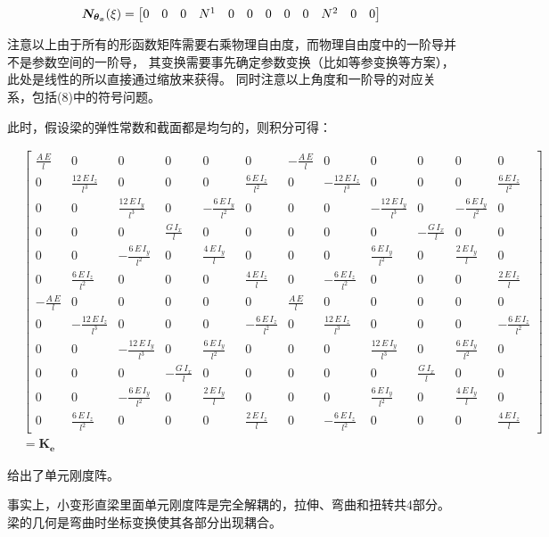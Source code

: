 \documentclass[UTF8,c5size]{ctexart}
\begin{document}
\begin{equation}
    \bm{N_{\theta_x}}(\xi) = 
    \addtocounter{MaxMatrixCols}{40}
    \begin{bmatrix}
        0&0&0&N^1&0&0&0&0&0&N^2&0&0
    \end{bmatrix}
\end{equation}

注意以上由于所有的形函数矩阵需要右乘物理自由度，而物理自由度中的一阶导并不是参数空间的一阶导，
其变换需要事先确定参数变换（比如等参变换等方案），此处是线性的所以直接通过缩放来获得。
同时注意以上角度和一阶导的对应关系，包括(8)中的符号问题。

此时，假设梁的弹性常数和截面都是均匀的，则积分可得：

\begin{equation}
    \begin{split}
        &\left[\begin{array}{cccccccccccc} \frac{A\,E}{l} & 0 & 0 & 0 & 0 & 0 & -\frac{A\,E}{l} & 0 & 0 & 0 & 0 & 0\\ 0 & \frac{12\,E\,I_{z}}{l^3} & 0 & 0 & 0 & \frac{6\,E\,I_{z}}{l^2} & 0 & -\frac{12\,E\,I_{z}}{l^3} & 0 & 0 & 0 & \frac{6\,E\,I_{z}}{l^2}\\ 0 & 0 & \frac{12\,E\,I_{y}}{l^3} & 0 & -\frac{6\,E\,I_{y}}{l^2} & 0 & 0 & 0 & -\frac{12\,E\,I_{y}}{l^3} & 0 & -\frac{6\,E\,I_{y}}{l^2} & 0\\ 0 & 0 & 0 & \frac{G\,I_{x}}{l} & 0 & 0 & 0 & 0 & 0 & -\frac{G\,I_{x}}{l} & 0 & 0\\ 0 & 0 & -\frac{6\,E\,I_{y}}{l^2} & 0 & \frac{4\,E\,I_{y}}{l} & 0 & 0 & 0 & \frac{6\,E\,I_{y}}{l^2} & 0 & \frac{2\,E\,I_{y}}{l} & 0\\ 0 & \frac{6\,E\,I_{z}}{l^2} & 0 & 0 & 0 & \frac{4\,E\,I_{z}}{l} & 0 & -\frac{6\,E\,I_{z}}{l^2} & 0 & 0 & 0 & \frac{2\,E\,I_{z}}{l}\\ -\frac{A\,E}{l} & 0 & 0 & 0 & 0 & 0 & \frac{A\,E}{l} & 0 & 0 & 0 & 0 & 0\\ 0 & -\frac{12\,E\,I_{z}}{l^3} & 0 & 0 & 0 & -\frac{6\,E\,I_{z}}{l^2} & 0 & \frac{12\,E\,I_{z}}{l^3} & 0 & 0 & 0 & -\frac{6\,E\,I_{z}}{l^2}\\ 0 & 0 & -\frac{12\,E\,I_{y}}{l^3} & 0 & \frac{6\,E\,I_{y}}{l^2} & 0 & 0 & 0 & \frac{12\,E\,I_{y}}{l^3} & 0 & \frac{6\,E\,I_{y}}{l^2} & 0\\ 0 & 0 & 0 & -\frac{G\,I_{x}}{l} & 0 & 0 & 0 & 0 & 0 & \frac{G\,I_{x}}{l} & 0 & 0\\ 0 & 0 & -\frac{6\,E\,I_{y}}{l^2} & 0 & \frac{2\,E\,I_{y}}{l} & 0 & 0 & 0 & \frac{6\,E\,I_{y}}{l^2} & 0 & \frac{4\,E\,I_{y}}{l} & 0\\ 0 & \frac{6\,E\,I_{z}}{l^2} & 0 & 0 & 0 & \frac{2\,E\,I_{z}}{l} & 0 & -\frac{6\,E\,I_{z}}{l^2} & 0 & 0 & 0 & \frac{4\,E\,I_{z}}{l} \end{array}\right]
        \\
        &=\bm{K_e}
    \end{split}
\end{equation}

给出了单元刚度阵。

事实上，小变形直梁里面单元刚度阵是完全解耦的，拉伸、弯曲和扭转共4部分。
梁的几何是弯曲时坐标变换使其各部分出现耦合。
    
\end{document}
